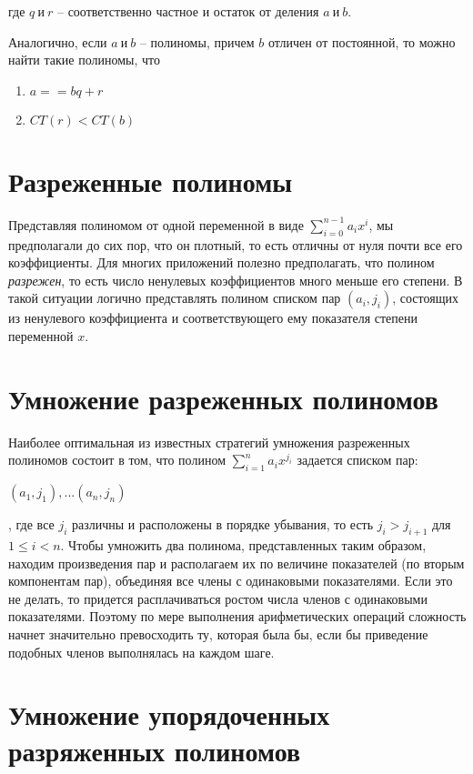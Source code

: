 \documentclass[bachelor, och, labwork]{shiza}
\begin{document}
где $q ~\text{и}~ r$ -- соответственно частное и остаток от деления $a ~\text{и}~ b$.

Аналогично, если $a ~\text{и}~ b$ -- полиномы, причем $b$ отличен от постоянной,
то можно найти такие полиномы, что
\begin{enumerate}
    \item $a==bq+r$
    \item $CT(r)<CT(b)$
\end{enumerate}

\section{Разреженные полиномы}
Представляя полиномом от одной переменной в виде $\sum\limits_{i=0}^{n-1}{a_ix^i}$,
мы предполагали до сих пор, что он плотный, то есть отличны от нуля почти все 
его коэффициенты. Для многих приложений полезно предполагать, что полином
\textit{разрежен}, то есть число ненулевых коэффициентов много меньше его степени.
В такой ситуации логично представлять полином списком пар $(a_i, j_i)$, состоящих
из ненулевого коэффициента и соответствующего ему показателя степени переменной
$x$. 

\section{Умножение разреженных полиномов}

Наиболее оптимальная из известных стратегий умножения разреженных \\полиномов
состоит в том, что полином $\sum\limits_{i=1}^n{a_ix^{j_i}}$ задается списком пар:
\begin{center}$(a_1,j_1),...(a_n,j_n)$\end{center},
где все $j_i$ различны и расположены в порядке убывания,
то есть $j_i>j_{i+1}$ для $1\leq i < n$. Чтобы умножить два полинома,
представленных таким образом, находим произведения пар и располагаем их по
величине показателей (по вторым компонентам пар), объединяя все члены с одинаковыми
показателями. Если это не делать, то придется расплачиваться ростом числа членов
с одинаковыми показателями. Поэтому по мере выполнения арифметических операций
сложность начнет значительно превосходить ту, которая была бы, если бы приведение
подобных членов выполнялась на каждом шаге.

\section{Умножение упорядоченных разряженных полиномов}
\end{document}
